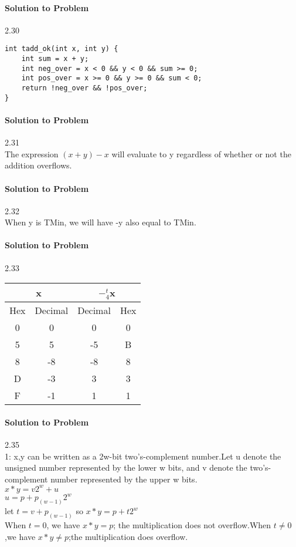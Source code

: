 \documentclass{report}
\begin{document}
\paragraph{Solution to Problem} 2.30 \\


\begin{lstlisting}
int tadd_ok(int x, int y) {
    int sum = x + y;
    int neg_over = x < 0 && y < 0 && sum >= 0;
    int pos_over = x >= 0 && y >= 0 && sum < 0;
    return !neg_over && !pos_over;
}
\end{lstlisting}

\paragraph{Solution to Problem} 2.31 \\
The expression $(x+y)-x$ will evaluate to y regardless of whether or not the addition overflows.

\paragraph{Solution to Problem} 2.32 \\
When y is TMin, we will have -y also equal to TMin.


\paragraph{Solution to Problem} 2.33 \\
\begin{center}
\begin{tabular}{ |c|c|c|c| } 
\hline
\multicolumn{2}{|c|}{x}  &   \multicolumn{2}{|c|}{$-^t_4$x}  \\  \hline
Hex & Decimal & Decimal & Hex  \\   \hline 
0 & 0 & 0 & 0 \\
5 & 5 & -5 & B  \\ 
8 & -8 & -8 & 8 \\
D & -3 & 3 & 3 \\
F & -1 & 1 & 1 \\ \hline
\end{tabular}
\end{center}

\paragraph{Solution to Problem} 2.35 \\
1: x,y can be written as a 2w-bit two's-complement number.Let u denote the unsigned number represented by the lower w bits, and v denote the two's-complement number represented by the upper w bits. \\
$x * y = v2^w + u$ \\
$u = p + p_(w-1)2^w$ \\
let $t = v + p_(w-1)$
so $x * y = p + t2^w$ \\
When $t = 0$, we have $x * y = p$; the multiplication does not overflow.When $t \neq 0$ ,we have $x * y \neq p$;the multiplication does overflow.
\end{document}
